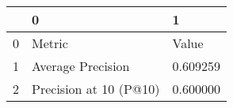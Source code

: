 \begin{tabular}{lll}
\toprule
 & 0 & 1 \\
\midrule
0 & Metric & Value \\
1 & Average Precision & 0.609259 \\
2 & Precision at 10 (P@10) & 0.600000 \\
\bottomrule
\end{tabular}
